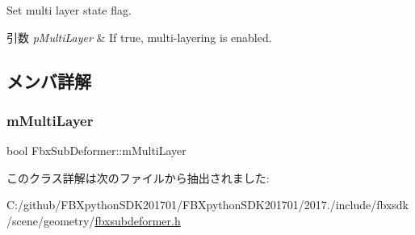 Set multi layer state flag. 
\begin{DoxyParams}{引数}
{\em p\+Multi\+Layer} & If {\ttfamily true}, multi-\/layering is enabled. \\
\hline
\end{DoxyParams}


\subsection{メンバ詳解}
\mbox{\label{class_fbx_sub_deformer_aedda8831e40648602b073c9613687e9d}} 
\subsubsection{\texorpdfstring{m\+Multi\+Layer}{mMultiLayer}}
{\footnotesize\ttfamily bool Fbx\+Sub\+Deformer\+::m\+Multi\+Layer\hspace{0.3cm}{\ttfamily [protected]}}



このクラス詳解は次のファイルから抽出されました\+:\begin{DoxyCompactItemize}
\item 
C\+:/github/\+F\+B\+Xpython\+S\+D\+K201701/\+F\+B\+Xpython\+S\+D\+K201701/2017./include/fbxsdk/scene/geometry/\hyperlink{fbxsubdeformer_8h}{fbxsubdeformer.\+h}\end{DoxyCompactItemize}
